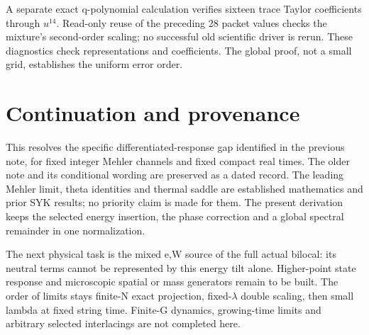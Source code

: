 \documentclass[11pt]{article}
\begin{document}
A separate exact q-polynomial calculation verifies sixteen trace
Taylor coefficients through $u^{14}$. Read-only reuse of the
preceding 28 packet values checks the mixture's second-order
scaling; no successful old scientific driver is rerun.
These diagnostics check representations and coefficients. The
global proof, not a small grid, establishes the uniform error order.

\newpage
\section{Continuation and provenance}
This resolves the specific differentiated-response gap identified
in the previous note, for fixed integer Mehler channels and fixed
compact real times. The older note and its conditional wording
are preserved as a dated record. The leading Mehler limit,
theta identities and thermal saddle are established mathematics
and prior SYK results; no priority claim is made for them.
The present derivation keeps the selected energy insertion,
the phase correction and a global spectral remainder in one normalization.

The next physical task is the mixed e,W source of the full actual
bilocal: its neutral terms cannot be represented by this energy
tilt alone. Higher-point state response and microscopic spatial
or mass generators remain to be built. The order of limits stays
finite-N exact projection, fixed-$\lambda$ double scaling, then
small lambda at fixed string time. Finite-G dynamics, growing-time
limits and arbitrary selected interlacings are not completed here.
\end{document}
